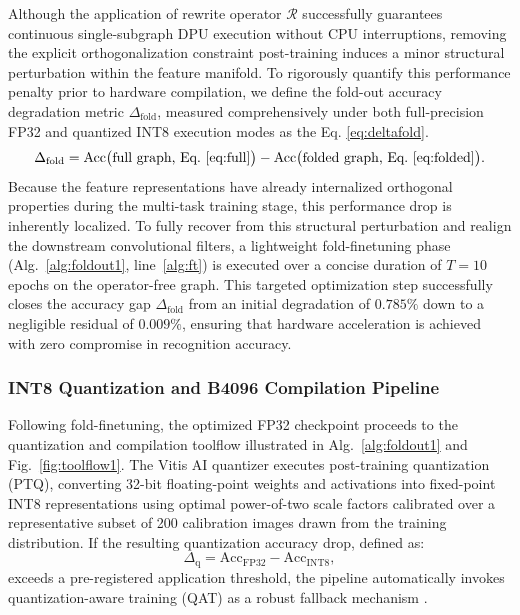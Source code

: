 \documentclass[algorithms,article,submit,moreauthors]{Definitions/mdpi}
\begin{document}
Although the application of rewrite operator $\mathcal{R}$ successfully guarantees continuous single-subgraph DPU execution without CPU interruptions, removing the explicit orthogonalization constraint post-training induces a minor structural perturbation within the feature manifold. To rigorously quantify this performance penalty prior to hardware compilation, we define the fold-out accuracy degradation metric $\Delta_{\mathrm{fold}}$, measured comprehensively under both full-precision FP32 and quantized INT8 execution modes as the Eq. \eqref{eq:deltafold}.
\begin{equation}
\Delta_{\mathrm{fold}} = \mathrm{Acc}\big(\text{full graph, Eq.~\eqref{eq:full}}\big)
- \mathrm{Acc}\big(\text{folded graph, Eq.~\eqref{eq:folded}}\big).
\label{eq:deltafold}
\end{equation}
Because the feature representations have already internalized orthogonal properties during the multi-task training stage, this performance drop is inherently localized. To fully recover from this structural perturbation and realign the downstream convolutional filters, a lightweight fold-finetuning phase (Alg.~\ref{alg:foldout1}, line~\ref{alg:ft}) is executed over a concise duration of $T=10$ epochs on the operator-free graph. This targeted optimization step successfully closes the accuracy gap $\Delta_{\mathrm{fold}}$ from an initial degradation of $0.785\%$ down to a negligible residual of $0.009\%$, ensuring that hardware acceleration is achieved with zero compromise in recognition accuracy.

\subsubsection{INT8 Quantization and B4096 Compilation Pipeline}\label{sec:quant}

Following fold-finetuning, the optimized FP32 checkpoint proceeds to the quantization and compilation toolflow illustrated in Alg.~\ref{alg:foldout1} and Fig.~\ref{fig:toolflow1}. The Vitis AI quantizer executes post-training quantization (PTQ), converting 32-bit floating-point weights and activations into fixed-point INT8 representations using optimal power-of-two scale factors calibrated over a representative subset of 200 calibration images drawn from the training distribution. If the resulting quantization accuracy drop, defined as:
\begin{equation}
\Delta_{\mathrm{q}} = \mathrm{Acc}_{\mathrm{FP32}} - \mathrm{Acc}_{\mathrm{INT8}},
\label{eq:deltaq}
\end{equation}
exceeds a pre-registered application threshold, the pipeline automatically invokes quantization-aware training (QAT) as a robust fallback mechanism \citep{bib9}. 
\end{document}
